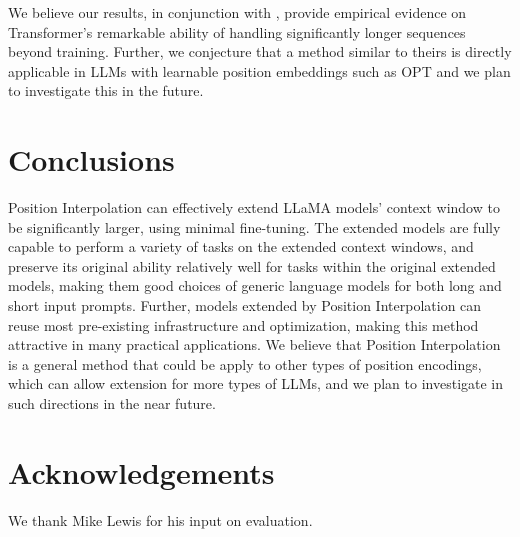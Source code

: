 \documentclass{article} %
\theoremstyle{definition}
\newcommand{\ignore}[1]{}
\begin{document}
\ignore{
{\noindent \bf Extending Large Language Model's Context Window} Recently there have been a few works trying to extend LLM's context window length w/o re-running pre-training which can be prohibitively expensive. \cite{ratner2022parallel} directly extend LLM's context window length at inference time by chunking the input to smaller windows; \cite{mohtashami2023landmark} extended to 32k size by finetuning "landmark" tokens. \cite{kazemnejad2023impact} proposed to remove positional encoding completely to bypass the window size limit. Our work aims at extending LLM's context window without any assumption on specific downstream tasks; in other words, we shoot for extending context length while preserving LLM's general-purpose capabilities.  
}
We believe our results, in conjunction with \citep{dosovitskiy2021an}, provide empirical evidence on Transformer's remarkable ability of handling significantly longer sequences beyond training. 
Further, we conjecture that a method similar to theirs is directly applicable in LLMs with learnable position embeddings such as OPT \citep{zhang2022opt} and we plan to investigate this in the future.

\section{Conclusions}
Position Interpolation can effectively extend LLaMA models' context window to be significantly larger, using minimal fine-tuning.
The extended models are fully capable to perform a variety of tasks on the extended context windows, and preserve its original 
ability relatively well for tasks within the original extended models, making them good choices of generic language models 
for both long and short input prompts.
Further, models extended by Position Interpolation can reuse most pre-existing infrastructure and optimization, making this method
attractive in many practical applications.
We believe that Position Interpolation is a general method that could be apply to other 
types of position encodings, which can allow extension for more types of LLMs, and we plan to investigate in such directions in the near future.

\section*{Acknowledgements}
We thank Mike Lewis for his input on evaluation.



\end{document}

